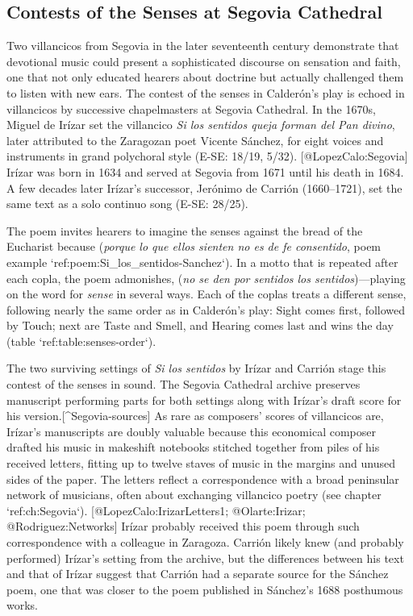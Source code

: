 \subsection{Contests of the Senses at Segovia Cathedral}

Two villancicos from Segovia in the later seventeenth century demonstrate that devotional music could present a sophisticated discourse on sensation and faith, one that not only educated hearers about doctrine but actually challenged them to listen with new ears.
The contest of the senses in Calderón's play is echoed in villancicos by successive chapelmasters at Segovia Cathedral.
In the 1670s, Miguel de Irízar set the villancico \emph{Si los sentidos queja forman del Pan divino}, later attributed to the Zaragozan poet Vicente Sánchez, for eight voices and instruments in grand polychoral style (E-SE: 18/19, 5/32).
[@LopezCalo:Segovia]
Irízar was born in 1634 and served at Segovia from 1671 until his death in 1684.
A few decades later Irízar's successor, Jerónimo de Carrión (1660--1721), set the same text as a solo continuo song (E-SE: 28/25).
\Autocite[133--152]{Cashner:WLSCM32}

The poem invites hearers to imagine the senses  against the bread of the Eucharist because  (\emph{porque lo que ellos sienten no es de fe consentido}, poem example `ref:poem:Si_los_sentidos-Sanchez`).
\Autocite[171--172]{Sanchez:LiraPoetica}
In a motto that is repeated after each copla, the poem admonishes,  (\emph{no se den por sentidos los sentidos})---playing on the word for \emph{sense} in several ways.
Each of the coplas treats a different sense, following nearly the same order as in Calderón's play: Sight comes first, followed by Touch; next are Taste and Smell, and Hearing comes last and wins the day (table `ref:table:senses-order`).


\label{poem:Si_los_sentidos-Sanchez}


\label{table:senses-order}

The two surviving settings of \emph{Si los sentidos} by Irízar and Carrión stage this contest of the senses in sound.
The Segovia Cathedral archive preserves manuscript performing parts for both settings along with Irízar's draft score for his version.[^Segovia-sources]
As rare as composers' scores of villancicos are, Irízar's manuscripts are doubly valuable because this economical composer drafted his music in makeshift notebooks stitched together from piles of his received letters, fitting up to twelve staves of music in the margins and unused sides of the paper.
The letters reflect a correspondence with a broad peninsular network of musicians, often about exchanging villancico poetry (see chapter `ref:ch:Segovia`).
[@LopezCalo:IrizarLetters1; @Olarte:Irizar; @Rodriguez:Networks]
Irízar probably received this poem through such correspondence with a colleague in Zaragoza.
Carrión likely knew (and probably performed) Irízar's setting from the archive, but the differences between his text and that of Irízar suggest that Carrión had a separate source for the Sánchez poem, one that was closer to the poem published in Sánchez's 1688 posthumous works.
\Autocite[171--172]{Sanchez:LiraPoetica}

